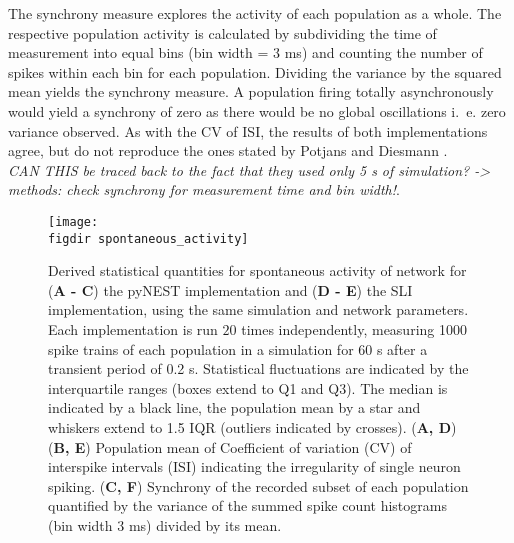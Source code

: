 The synchrony measure explores the activity of each population as a whole. The respective population
activity is calculated by subdividing the time of measurement into equal bins (bin width = $3$ ms) 
and counting the number of spikes within each bin for each population. 
Dividing the variance by the squared mean yields the synchrony measure. 
A population firing totally asynchronously would yield a synchrony of zero as there would 
be no global oscillations i.~e. zero variance observed.
As with the CV of ISI, the results of both implementations agree, but do not reproduce the ones stated 
by Potjans and Diesmann \cite{potjans2014}. 
\\\emph{CAN THIS be traced back to the fact that they used 
only 5 s of simulation? -> methods: check synchrony for measurement time and bin width!}. 
\begin{figure}[htpb]
    \centering
    \texttt{[image: \\figdir spontaneous\_activity]}
    \caption{
        Derived statistical quantities for spontaneous activity of network for
        (\textbf{A - C}) the pyNEST implementation and (\textbf{D - E}) the SLI implementation, 
        using the same simulation and network parameters.
        Each implementation is run $20$ times independently, 
        measuring 1000 spike trains of each population in a simulation for 60 s 
        after a transient period of 0.2 s. 
        Statistical fluctuations 
        are indicated by the interquartile ranges (boxes extend to Q1 and Q3). 
        The median is indicated by a black line, the population mean by a star and 
        whiskers extend to 1.5 IQR (outliers indicated by crosses). 
        \quad (\textbf{A, D}) 
        \quad (\textbf{B, E}) Population mean of Coefficient of variation (CV) of interspike intervals (ISI) indicating 
        the irregularity of single neuron spiking. 
        \quad (\textbf{C, F}) Synchrony of the recorded subset of each population quantified by the 
        variance of the summed spike count histograms (bin width 3 ms) divided by
        its mean. 
    }
    \label{fig:spontaneous_activity}
\end{figure}

